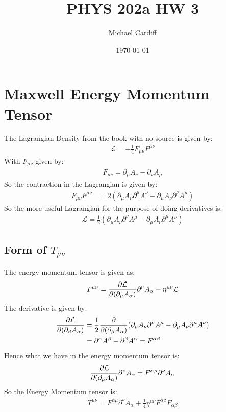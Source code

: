 \documentclass[12pt]{article}
\title{\vspace{-3em}PHYS 202a HW 3}
\author{Michael Cardiff}
\date{\today}
\renewcommand{\L}{\mathcal{L}}
\newcommand{\D}{\partial}
\begin{document}
\maketitle

\section{Maxwell Energy Momentum Tensor}
The Lagrangian Density from the book with no source is given by:
\begin{align*}
  \L=-\frac14F_{\mu\nu}F^{\mu\nu}
\end{align*}
With $F_{\mu\nu}$ given by:
\begin{align*}
  F_{\mu\nu}=\D_\mu A_\nu-\D_\nu A_\mu
\end{align*}
So the contraction in the Lagrangian is given by:
\begin{align*}
  F_{\mu\nu}F^{\mu\nu}&=2(\D_\mu A_\nu\D^\mu A^\nu-\D_\mu A_\nu\D^\nu A^\mu)
\end{align*}
So the more useful Lagrangian for the purpose of doing derivatives is:
\begin{align*}
  \L=\frac12(\D_\mu A_\nu\D^\nu A^\mu-\D_\mu A_\nu\D^\mu A^\nu)
\end{align*}

\subsection{Form of $T_{\mu\nu}$}
The energy momentum tensor is given as:
\begin{align*}
  T^{\mu\nu}=\pdv{\L}{(\D_\mu A_\alpha)}\D^\nu A_\alpha-\eta^{\mu\nu}\L
\end{align*}
The derivative is given by:
\begin{align*}
  \pdv{\L}{(\D_\beta A_\alpha)}&=\frac12
  \pdv{(\D_\beta A_\alpha)}(\D_\mu A_\nu\D^\nu A^\mu-\D_\mu A_\nu\D^\mu A^\nu)\\
  &=\D^\alpha A^\beta-\D^\beta A^\alpha=F^{\alpha\beta}
\end{align*}
Hence what we have in the energy momentum tensor is:
\begin{align*}
  \pdv{\L}{(\D_\mu A_\alpha)}\D^\nu A_\alpha=F^{\alpha\mu}\D^\nu A_\alpha
\end{align*}
So the Energy Momentum tensor is:
\begin{align}
  \boxed{T^{\mu\nu}=F^{\alpha\mu}\D^\nu A_\alpha
    +\frac14\eta^{\mu\nu}F^{\alpha\beta}F_{\alpha\beta}}
\end{align}
\end{document}

